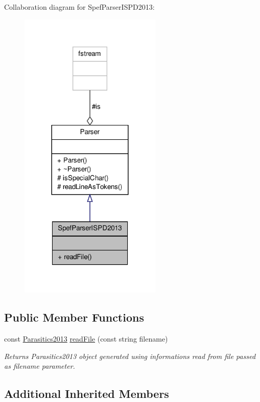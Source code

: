 Collaboration diagram for Spef\-Parser\-I\-S\-P\-D2013\-:\nopagebreak
\begin{figure}[H]
\begin{center}
\leavevmode
\includegraphics[width=192pt]{classSpefParserISPD2013__coll__graph}
\end{center}
\end{figure}
\subsection*{Public Member Functions}
\begin{DoxyCompactItemize}
\item 
const \hyperlink{spef__net_8h_adc6130507d68ab3a34d98dfc3ef83672}{Parasitics2013} \hyperlink{classSpefParserISPD2013_a11c71d121883895a367a99b052aada73}{read\-File} (const string filename)
\begin{DoxyCompactList}\small\item\em Returns Parasitics2013 object generated using informations read from file passed as filename parameter. \end{DoxyCompactList}\end{DoxyCompactItemize}
\subsection*{Additional Inherited Members}


